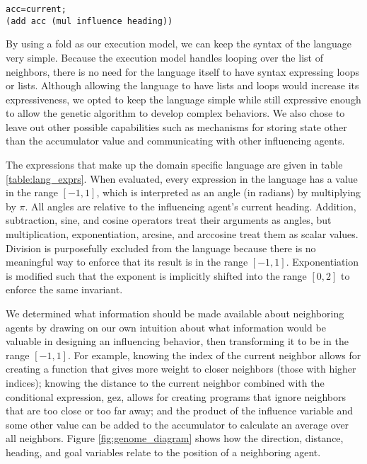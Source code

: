 \begin{lstlisting}[caption={A small genome that sets the agent's heading to the
average of its neighbors' headings},captionpos=b,label={listing:example_genome}]
acc=current;
(add acc (mul influence heading))
\end{lstlisting}

By using a fold as our execution model, we can keep the syntax of the language
very simple.
Because the execution model handles looping over the list of neighbors, there
is no need for the language itself to have syntax expressing loops or lists.
Although allowing the language to have lists and loops would increase its
expressiveness, we opted to keep the language simple while still expressive
enough to allow the genetic algorithm to develop complex behaviors.
We also chose to leave out other possible capabilities such as mechanisms for
storing state other than the accumulator value and communicating with other
influencing agents.

The expressions that make up the domain specific language are given in table
\ref{table:lang_exprs}.
When evaluated, every expression in the language has a value in the range
$[-1,1]$, which is interpreted as an angle (in radians) by multiplying by
$\pi$.
All angles are relative to the influencing agent's current heading.
Addition, subtraction, sine, and cosine operators treat their arguments as
angles, but multiplication, exponentiation, arcsine, and arccosine treat them
as scalar values.
Division is purposefully excluded from the language because there is no
meaningful way to enforce that its result is in the range $[-1, 1]$.
Exponentiation is modified such that the exponent is implicitly shifted into
the range $[0, 2]$ to enforce the same invariant.

We determined what information should be made available about neighboring
agents by drawing on our own intuition about what information would be valuable
in designing an influencing behavior, then transforming it to be in the range
$[-1, 1]$.
For example, knowing the index of the current neighbor allows for creating a
function that gives more weight to closer neighbors (those with higher indices);
knowing the distance to the current neighbor combined with the conditional
expression, gez, allows for creating programs that ignore neighbors that are
too close or too far away;
and the product of the influence variable and some other value can be added to
the accumulator to calculate an average over all neighbors.
Figure \ref{fig:genome_diagram} shows how the direction, distance, heading, and
goal variables relate to the position of a neighboring agent.

